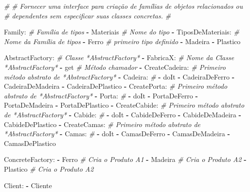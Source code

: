 \documentclass[]{article}
\newenvironment{Shaded}{}{}
\newcommand{\KeywordTok}[1]{\textcolor[rgb]{0.00,0.44,0.13}{\textbf{{#1}}}}
\newcommand{\CommentTok}[1]{\textcolor[rgb]{0.38,0.63,0.69}{\textit{{#1}}}}
\newcommand{\FunctionTok}[1]{\textcolor[rgb]{0.02,0.16,0.49}{{#1}}}
\newcommand{\NormalTok}[1]{{#1}}
\begin{document}
\begin{Shaded}
\begin{Highlighting}[]
\CommentTok{#}
\CommentTok{# Fornecer uma interface para criação de famílias de objetos relacionados ou}
\CommentTok{# dependentes sem especificar suas classes concretas.}
\CommentTok{#}

\FunctionTok{Family:}                     \CommentTok{# Família de tipos}
\KeywordTok{-} \NormalTok{Materiais                 }\CommentTok{# Nome do tipo}
\KeywordTok{-} \FunctionTok{TiposDeMateriais:}         \CommentTok{# Nome da Família de tipos}
    \KeywordTok{-} \NormalTok{Ferro                 }\CommentTok{# primeiro tipo definido}
    \KeywordTok{-} \NormalTok{Madeira}
    \KeywordTok{-} \NormalTok{Plastico}

\FunctionTok{AbstractFactory:}            \CommentTok{# Classe *AbstractFactory*}
\KeywordTok{-} \FunctionTok{FabricaX:}                 \CommentTok{# Nome da Classe *AbstractFactory*}
    \KeywordTok{-} \NormalTok{get                   }\CommentTok{# Método chamador}
    \KeywordTok{-} \FunctionTok{CreateCadeira:}        \CommentTok{# Primeiro método abstrato de *AbstractFactory*}
        \KeywordTok{-} \FunctionTok{Cadeira:}          \CommentTok{# }
            \KeywordTok{-} \NormalTok{doIt}
            \KeywordTok{-} \NormalTok{CadeiraDeFerro}
            \KeywordTok{-} \NormalTok{CadeiraDeMadeira}
            \KeywordTok{-} \NormalTok{CadeiraDePlastico}
    \KeywordTok{-} \FunctionTok{CreatePorta:}          \CommentTok{# Primeiro método abstrato de *AbstractFactory*}
        \KeywordTok{-} \FunctionTok{Porta:}            \CommentTok{# }
            \KeywordTok{-} \NormalTok{doIt}
            \KeywordTok{-} \NormalTok{PortaDeFerro}
            \KeywordTok{-} \NormalTok{PortaDeMadeira}
            \KeywordTok{-} \NormalTok{PortaDePlastico}
    \KeywordTok{-} \FunctionTok{CreateCabide:}        \CommentTok{# Primeiro método abstrato de *AbstractFactory*}
        \KeywordTok{-} \FunctionTok{Cabide:}          \CommentTok{# }
            \KeywordTok{-} \NormalTok{doIt}
            \KeywordTok{-} \NormalTok{CabideDeFerro}
            \KeywordTok{-} \NormalTok{CabideDeMadeira}
            \KeywordTok{-} \NormalTok{CabideDePlastico}
    \KeywordTok{-} \FunctionTok{CreateCamas:}        \CommentTok{# Primeiro método abstrato de *AbstractFactory*}
        \KeywordTok{-} \FunctionTok{Camas:}          \CommentTok{# }
            \KeywordTok{-} \NormalTok{doIt}
            \KeywordTok{-} \NormalTok{CamasDeFerro}
            \KeywordTok{-} \NormalTok{CamasDeMadeira}
            \KeywordTok{-} \NormalTok{CamasDePlastico}

\FunctionTok{ConcreteFactory:}
\KeywordTok{-} \NormalTok{Ferro      }\CommentTok{# Cria o Produto A1}
\KeywordTok{-} \NormalTok{Madeira    }\CommentTok{# Cria o Produto A2}
\KeywordTok{-} \NormalTok{Plastico   }\CommentTok{# Cria o Produto A2}

\FunctionTok{Client:}
\KeywordTok{-} \NormalTok{Cliente}
\end{Highlighting}
\end{Shaded}
\end{document}
